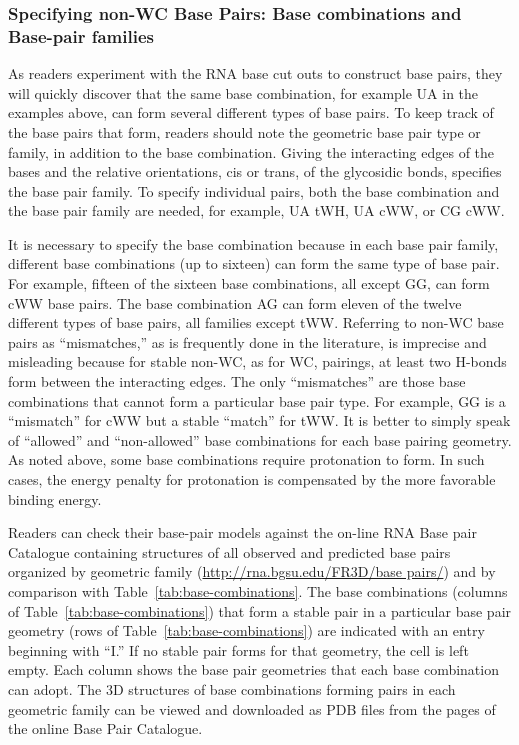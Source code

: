\subsubsection{Specifying non-WC Base Pairs: Base combinations and Base-pair
families}

As readers experiment with the RNA base cut outs to construct base pairs, they
will quickly discover that the same base combination, for example UA in the
examples above, can form several different types of base pairs. To keep track of
the base pairs that form, readers should note the geometric base pair type or
family, in addition to the base combination. Giving the interacting edges of the
bases and the relative orientations, cis or trans, of the glycosidic bonds,
specifies the base pair family. To specify individual pairs, both the base
combination and the base pair family are needed, for example, UA tWH, UA cWW, or
CG cWW. 

It is necessary to specify the base combination because in each base pair
family, different base combinations (up to sixteen) can form the same type of
base pair. For example, fifteen of the sixteen base combinations, all except GG,
can form cWW base pairs. The base combination AG can form eleven of the twelve
different types of base pairs, all families except tWW. Referring to non-WC base
pairs as ``mismatches,'' as is frequently done in the literature, is imprecise and
misleading because for stable non-WC, as for WC, pairings, at least two H-bonds
form between the interacting edges. The only ``mismatches'' are those base
combinations that cannot form a particular base pair type. For example, GG is a
``mismatch'' for cWW but a stable ``match'' for tWW. It is better to simply speak of
``allowed'' and ``non-allowed'' base combinations for each base pairing geometry. As
noted above, some base combinations require protonation to form. In such cases,
the energy penalty for protonation is compensated by the more favorable binding
energy.

Readers can check their base-pair models against the on-line RNA Base pair
Catalogue containing structures of all observed and predicted base pairs
organized by geometric family (\url{http://rna.bgsu.edu/FR3D/base pairs/}) and
by comparison with Table~\ref{tab:base-combinations}. The base combinations (columns of Table~\ref{tab:base-combinations}) that form
a stable pair in a particular base pair geometry (rows of Table~\ref{tab:base-combinations}) are indicated
with an entry beginning with ``I.'' If no stable pair forms for that geometry, the
cell is left empty. Each column shows the base pair geometries that each base
combination can adopt. The 3D structures of base combinations forming pairs in
each geometric family can be viewed and downloaded as PDB files from the pages
of the online Base Pair Catalogue. 

